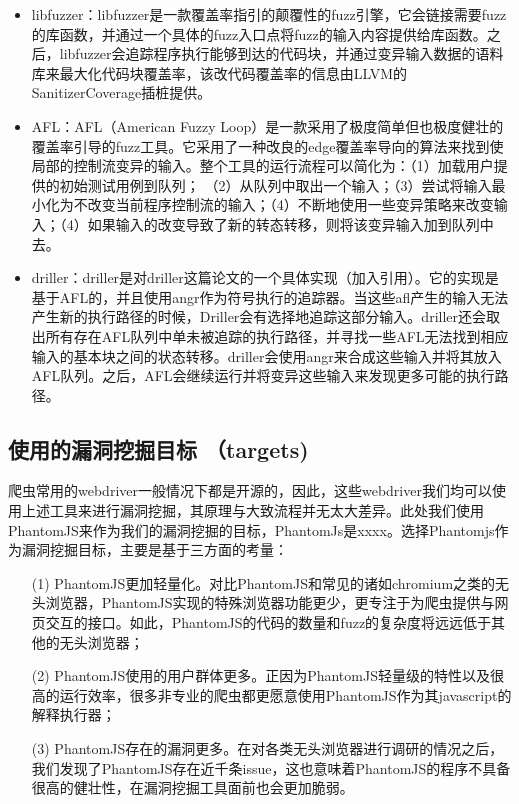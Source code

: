 \documentclass[doctor,privacy,twoside]{buaa_mac}
\begin{document}
\begin{itemize}
\item libfuzzer：libfuzzer是一款覆盖率指引的颠覆性的fuzz引擎，它会链接需要fuzz的库函数，并通过一个具体的fuzz入口点将fuzz的输入内容提供给库函数。之后，libfuzzer会追踪程序执行能够到达的代码块，并通过变异输入数据的语料库来最大化代码块覆盖率，该改代码覆盖率的信息由LLVM的SanitizerCoverage插桩提供。

\item AFL：AFL（American Fuzzy Loop）是一款采用了极度简单但也极度健壮的覆盖率引导的fuzz工具。它采用了一种改良的edge覆盖率导向的算法来找到使局部的控制流变异的输入。整个工具的运行流程可以简化为：（1）加载用户提供的初始测试用例到队列； （2）从队列中取出一个输入；（3）尝试将输入最小化为不改变当前程序控制流的输入；（4）不断地使用一些变异策略来改变输入；（4）如果输入的改变导致了新的转态转移，则将该变异输入加到队列中去。

\item driller：driller是对driller这篇论文的一个具体实现（加入引用）。它的实现是基于AFL的，并且使用angr作为符号执行的追踪器。当这些afl产生的输入无法产生新的执行路径的时候，Driller会有选择地追踪这部分输入。driller还会取出所有存在AFL队列中单未被追踪的执行路径，并寻找一些AFL无法找到相应输入的基本块之间的状态转移。driller会使用angr来合成这些输入并将其放入AFL队列。之后，AFL会继续运行并将变异这些输入来发现更多可能的执行路径。

\end{itemize}



\subsection{使用的漏洞挖掘目标 （targets)}
爬虫常用的webdriver一般情况下都是开源的，因此，这些webdriver我们均可以使用上述工具来进行漏洞挖掘，其原理与大致流程并无太大差异。此处我们使用PhantomJS来作为我们的漏洞挖掘的目标，PhantomJs是xxxx。选择Phantomjs作为漏洞挖掘目标，主要是基于三方面的考量：

\begin{itemize}
\item[(1)] PhantomJS更加轻量化。对比PhantomJS和常见的诸如chromium之类的无头浏览器，PhantomJS实现的特殊浏览器功能更少，更专注于为爬虫提供与网页交互的接口。如此，PhantomJS的代码的数量和fuzz的复杂度将远远低于其他的无头浏览器；
\item[(2)]  PhantomJS使用的用户群体更多。正因为PhantomJS轻量级的特性以及很高的运行效率，很多非专业的爬虫都更愿意使用PhantomJS作为其javascript的解释执行器；
\item[(3)]  PhantomJS存在的漏洞更多。在对各类无头浏览器进行调研的情况之后，我们发现了PhantomJS存在近千条issue，这也意味着PhantomJS的程序不具备很高的健壮性，在漏洞挖掘工具面前也会更加脆弱。
\end{itemize}
\end{document}
